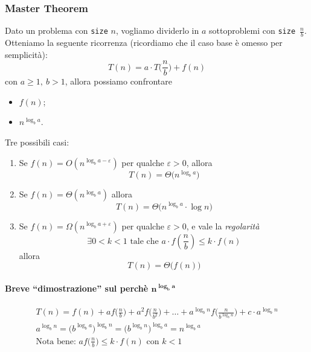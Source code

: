 \subsubsection{Master Theorem} \label{mastertheorem}
Dato un problema con \texttt{size} $n$, vogliamo dividerlo in $a$ sottoproblemi 
con \mbox {\texttt{size} $\frac{n}{b}$}. Otteniamo la seguente ricorrenza (ricordiamo che
il caso base è omesso per semplicità):
\[
    T(n) = a \cdot T\Big(\frac{n}{b}\Big) + f(n)
\]
con $a \geq 1, \ b > 1$, allora possiamo confrontare
\begin{itemize}
    \item $f(n)$;
    \item $n^{\log_b a}$.
\end{itemize}
Tre possibili casi:
\begin{enumerate}
    \item Se $f(n) = O(n^{\log_b a - \varepsilon})$ per qualche $\varepsilon > 0$,
    allora $$T(n) = \Theta \big( n^{\log_b a} \big)$$
    
    \item Se $f(n) = \Theta (n^{\log_b a})$ allora 
    $$T(n) = \Theta \big( n^{\log_b a} \cdot \log n \big)$$
    
    \item Se $f(n) = \Omega (n^{\log_b a + \varepsilon})$ per qualche $\varepsilon > 0$,
    e vale la \emph{regolarità}
    $$ \exists 0 < k < 1 \text{ tale che } a \cdot f(\frac{n}{b}) \leq k \cdot f(n)$$
    allora
    $$ T(n) = \Theta \big( f(n) \big) $$ 
\end{enumerate}

\paragraph{Breve ``dimostrazione'' sul perchè $\boldsymbol{n^{\log_b a}}$} 
\begin{gather*}
    T(n) = f(n) + af\Big(\frac{n}{b}\Big) + a^2f\Big(\frac{n}{b^2}\Big) + \dots + a^{\log_b n}f\Big(\frac{n}{b^{\log_b n}}\Big) + c \cdot a^{\log_b n} \\
    a^{\log_b n} = \big(b^{\log_b a}\big)^{\log_b n} = \big(b^{\log_b n}\big)^{\log_b a} = n^{\log_b a} \\
    \text{Nota bene: } af\Big(\frac{n}{b}\Big) \leq k \cdot f(n) \text{ con } k < 1
\end{gather*}

